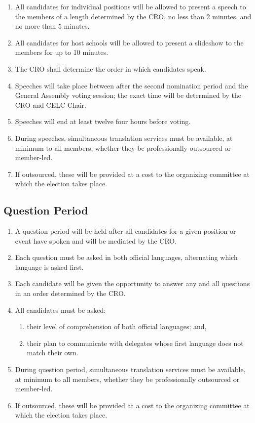 \begin{enumerate}
 \item
  All candidates for individual positions will be allowed to present a speech to the members of a length determined by the CRO, no less than 2 minutes, and no more than 5 minutes.
 \item
  All candidates for host schools will be allowed to present a slideshow to the members for up to 10 minutes.
 \item
  The CRO shall determine the order in which candidates speak.
 \item
  Speeches will take place between after the second nomination period and the General Assembly voting session; the exact time will be determined by the CRO and CELC Chair.
 \item
  Speeches will end at least twelve four hours before voting.
 \item
  During speeches, simultaneous translation services must be available, at minimum to all members, whether they be professionally outsourced or member-led.
 \item
  If outsourced, these will be provided at a cost to the organizing committee at which the election takes place.
\end{enumerate}

\subsection{Question Period}
\label{question-period}

\begin{enumerate}
 \item
  A question period will be held after all candidates for a given position or event have spoken and will be mediated by the CRO.
 \item
  Each question must be asked in both official languages, alternating which language is asked first.
 \item
  Each candidate will be given the opportunity to answer any and all questions in an order determined by the CRO.
 \item
  All candidates must be asked:

  \begin{enumerate}
   \item
    their level of comprehension of both official languages; and,
   \item
    their plan to communicate with delegates whose first language does not match their own.
  \end{enumerate}

 \item
  During question period, simultaneous translation services must be available, at minimum to all members, whether they be professionally outsourced or member-led.
 \item
  If outsourced, these will be provided at a cost to the organizing committee at which the election takes place.
\end{enumerate}

